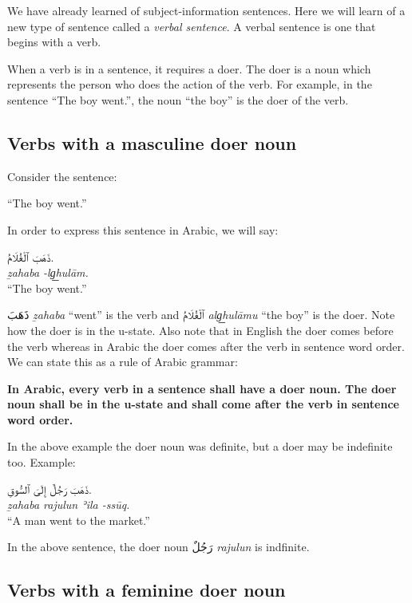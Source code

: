 \documentclass[
  10pt,
]{book}
\begin{document}
We have already learned of subject-information sentences. Here we will learn of a new type of sentence called a \emph{verbal sentence}. A verbal sentence is one that begins with a verb.

When a verb is in a sentence, it requires a doer. The doer is a noun which represents the person who does the action of the verb. For example, in the sentence \enquote{The boy went.}, the noun \enquote{the boy} is the doer of the verb.

\subsection{Verbs with a masculine doer noun}\label{verbs-with-a-masculine-doer-noun}

Consider the sentence:

\enquote{The boy went.}

In order to express this sentence in Arabic, we will say:

\foreignlanguage{arabic}{ذَهَبَ ٱلْغُلَامُ.}\\
\emph{ẕahaba -lg͟hulām.}\\
\enquote{The boy went.}

\foreignlanguage{arabic}{ذَهَبَ} \emph{ẕahaba} \enquote{went} is the verb and \foreignlanguage{arabic}{ٱلْغُلَامُ} \emph{alg͟hulāmu} \enquote{the boy} is the doer. Note how the doer is in the u-state. Also note that in English the doer comes before the verb whereas in Arabic the doer comes after the verb in sentence word order. We can state this as a rule of Arabic grammar:

\textbf{In Arabic, every verb in a sentence shall have a doer noun. The doer noun shall be in the u-state and shall come after the verb in sentence word order.}

In the above example the doer noun was definite, but a doer may be indefinite too. Example:

\foreignlanguage{arabic}{ذَهَبَ رَجُلٌ إِلَىَ ٱلسُّوقِ.}\\
\emph{ẕahaba rajulun ʾila -ssūq.}\\
\enquote{A man went to the market.}

In the above sentence, the doer noun \foreignlanguage{arabic}{رَجُلٌ} \emph{rajulun} is indfinite.

\subsection{Verbs with a feminine doer noun}\label{verbs-with-a-feminine-doer-noun}
\end{document}
